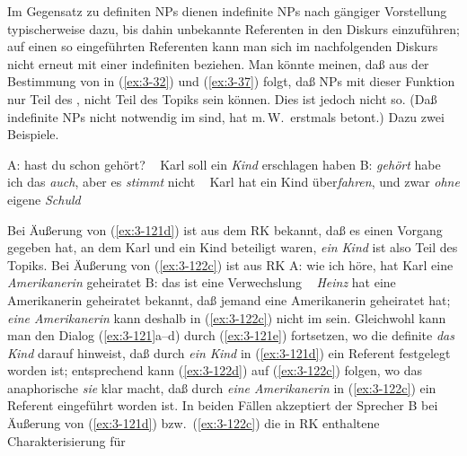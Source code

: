 \documentclass[output=paper]{langsci/langscibook}
\begin{document}
Im Gegensatz zu definiten NPs dienen indefinite NPs nach gängiger
Vorstellung typischerweise dazu, bis dahin unbekannte Referenten in
den Diskurs einzuführen; auf einen so eingeführten Referenten kann
man sich im nachfolgenden Diskurs nicht erneut mit einer indefiniten
 beziehen. Man könnte meinen, daß aus der Bestimmung von
 in (\ref{ex:3-32}) und (\ref{ex:3-37}) folgt, daß NPs mit dieser Funktion nur
Teil des , nicht Teil des Topiks sein können. Dies ist jedoch
nicht so. (Daß indefinite NPs nicht notwendig im  sind, hat
m.\,W.\ erstmals \citet[82]{Heidolph70} betont.) Dazu zwei Beispiele.
\begin{exe}
\ex
\label{ex:3-121}
\begin{xlist}
\ex
\label{ex:3-121a}
A: hast du schon gehört?
\ex
\label{ex:3-121b}
~\phantom{A} Karl soll ein \textit{Kind} erschlagen haben
\ex
\label{ex:3-121c}
B: \textit{gehört} habe ich das \textit{auch}, aber es \textit{stimmt} nicht
\ex
\label{ex:3-121d}
~\phantom{B} Karl hat ein Kind über\textit{fahren}, und zwar \textit{ohne} eigene \textit{Schuld}
\end{xlist}
\end{exe}
Bei Äußerung von (\ref{ex:3-121d}) ist aus dem RK bekannt, daß es einen Vorgang
gegeben hat, an dem Karl und ein Kind beteiligt waren, \textit{ein Kind} ist
also Teil des Topiks. Bei Äußerung von (\ref{ex:3-122c}) ist aus RK
\eal
\label{ex:3-122}
\ex
\label{ex:3-122a}
A: wie ich höre, hat Karl eine \textit{Amerikanerin} geheiratet
\ex
\label{ex:3-122b}
B: das ist eine Verwechslung
\ex
\label{ex:3-122c}
~\phantom{B} \textit{Heinz} hat eine Amerikanerin geheiratet
\zl
bekannt, daß jemand eine Amerikanerin geheiratet hat; \textit{eine Amerikanerin} kann deshalb in (\ref{ex:3-122c}) nicht im  sein. Gleichwohl kann man den Dialog (\ref{ex:3-121}a--d) durch (\ref{ex:3-121e}) fortsetzen, wo die definite  \textit{das Kind} darauf hinweist, daß durch \textit{ein Kind} in (\ref{ex:3-121d}) ein Referent festgelegt worden ist; entsprechend kann (\ref{ex:3-122d}) auf (\ref{ex:3-122c}) folgen, wo das anaphorische \textit{sie} klar macht, daß durch \textit{eine Amerikanerin} in (\ref{ex:3-122c}) ein Referent eingeführt worden ist. In beiden Fällen akzeptiert der Sprecher B bei Äußerung von (\ref{ex:3-121d}) bzw.\ (\ref{ex:3-122c}) die in RK enthaltene Charakterisierung für 
\begin{exe}
\end{exe}
\end{document}
